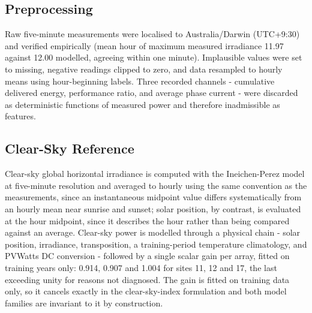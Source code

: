 \subsection{Preprocessing}
\label{sec:data-preprocessing}

Raw five-minute measurements were localised to Australia/Darwin
(UTC+9:30) and verified empirically (mean hour of maximum measured
irradiance 11.97 against 12.00 modelled, agreeing within one minute).
Implausible values were set to missing, negative readings clipped to
zero, and data resampled to hourly means using hour-beginning labels.
Three recorded channels - cumulative delivered energy, performance
ratio, and average phase current - were discarded as deterministic
functions of measured power and therefore inadmissible as features.

\subsection{Clear-Sky Reference}
\label{sec:data-clearsky}

Clear-sky global horizontal irradiance is computed with the
Ineichen-Perez model \cite{ineichen2002linke, holmgren2018pvlib} at
five-minute resolution and averaged to hourly using the same
convention as the measurements, since an instantaneous midpoint value
differs systematically from an hourly mean near sunrise and sunset;
solar position, by contrast, is evaluated at the hour midpoint, since
it describes the hour rather than being compared against an average.
Clear-sky power is modelled through a physical chain - solar position,
irradiance, transposition, a training-period temperature climatology,
and PVWatts DC conversion - followed by a single scalar gain per
array, fitted on training years only: 0.914, 0.907 and 1.004 for sites
11, 12 and 17, the last exceeding unity for reasons not diagnosed. The
gain is fitted on training data only, so it cancels exactly in the
clear-sky-index formulation and both model families are invariant to
it by construction.

